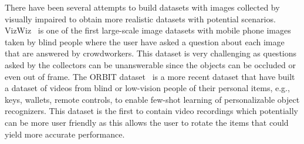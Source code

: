 There have been several attempts to build datasets with images collected by visually impaired to obtain more realistic datasets with potential scenarios. VizWiz~\cite{gurari2018vizwiz} is one of the first large-scale image datasets with mobile phone images taken by blind people where the user have asked a question about each image that are answered by crowdworkers. This dataset is very challenging as questions asked by the collectors can be unanswerable since the objects can be occluded or even out of frame. The ORBIT dataset~\cite{massiceti2021orbit} is a more recent dataset that have built a dataset of videos from blind or low-vision people of their personal items, e.g., keys, wallets, remote controls, to enable few-shot learning of personalizable object recognizers. This dataset is the first to contain video recordings which potentially can be more user friendly as this allows the user to rotate the items that could yield more accurate performance. 


